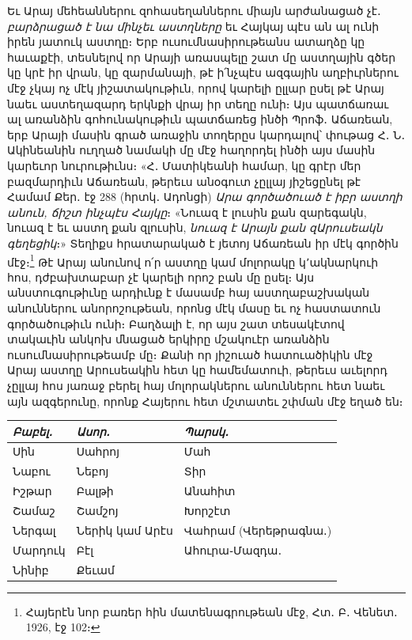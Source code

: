 \documentclass{article}
\begin{document}
{Եւ Արայ մեհեաններու զոհասեղաններու միայն արժանացած չէ․ \emph{բարձրացած է նա մինչեւ աստղները} եւ Հայկայ պէս ան ալ ունի իրեն յատուկ աստղը։ Երբ ուսումնասիրութեանս ատաղձը կը հաւաքէի, տեսնելով որ Արայի առասպելը շատ մը աստղային գծեր կը կրէ իր վրան, կը զարմանայի, թէ ի՛նչպէս ազգային աղբիւրներու մէջ չկայ ոչ մէկ յիշատակութիւն, որով կարելի ըլլար ըսել թէ Արայ նաեւ աստեղազարդ երկնքի վրայ իր տեղը ունի։ Այս պատճառաւ ալ առանձին գոհունակութիւն պատճառեց ինծի Պրոֆ․ Աճառեան, երբ Արայի մասին գրած առաջին տողերըս կարդալով՝ փութաց Հ․ Ն․ Ակինեանին ուղղած նամակի մը մէջ հաղորդել ինծի այս մասին կարեւոր նուրութիւնս։ «Հ․ Մատիկեանի համար, կը գրէր մեր բազմարդիւն Աճառեան, թերեւս անօգուտ չըլլայ յիշեցընել թէ Համամ Քեր․ էջ 288 (հրտկ․ Ադոնցի) \emph{Արա գործածուած է իբր աստղի անուն, ճիշտ ինչպէս Հայկը}։ «Նուազ է լուսին քան զարեգակն, նուազ է եւ աստղ քան զլուսին, \emph{նուազ է Արայն քան զԱրուսեակն գեղեցիկ}։» Տեղիքս հրատարակած է յետոյ Աճառեան իր մէկ գործին մէջ։\footnote{Հայերէն նոր բառեր հին մատենագրութեան մէջ, Հտ․ Բ․ Վենետ․ 1926, էջ 102։} Թէ Արայ անունով ո՛ր աստղը կամ մոլորակը կ՚ակնարկուի հոս, դժբախտաբար չէ կարելի որոշ բան մը ըսել։ Այս անստուգութիւնը արդիւնք է մասամբ հայ աստղաբաշխական անուններու անորոշութեան, որոնց մէկ մասը եւ ոչ հաստատուն գործածութիւն ունի։ Բաղձալի է, որ այս շատ տեսակէտով տակաւին անկոխ մնացած երկիրը մշակուէր առանձին ուսումնասիրութեամբ մը։ Քանի որ յիշուած հատուածիկին մէջ Արայ աստղը Արուսեակին հետ կը համեմատուի, թերեւս աւելորդ չըլլայ հոս յառաջ բերել հայ մոլորակներու անուններու հետ նաեւ այն ազգերունը, որոնք Հայերու հետ մշտատեւ շփման մէջ եղած են։}

\begin{table}[H]
    \centering
    \arm
    \bfseries
    \small
    \begin{tabular}{l l l}
        \emph{Բաբել․}  &  \emph{Ասոր․}         &  \emph{Պարսկ․}              \\ \hline
         Սին       &  Սահրոյ          &  Մահ                   \\
         Նաբու     &  Նեբոյ           &  Տիր                   \\ 
         Իշթար     &  Բալթի           &  Անահիտ                \\ 
         Շամաշ     &  Շամշոյ          &  Խորշէտ                \\
         Ներգալ    &  Ներիկ կամ Արէս  &  Վահրամ (Վերեթրագնա․)  \\ 
         Մարդուկ   &  Բէլ             &  Ահուրա֊Մազդա․         \\
         Նինիբ     &  Քեւամ           & ~ \\
    \end{tabular}
\end{table}
\end{document}
